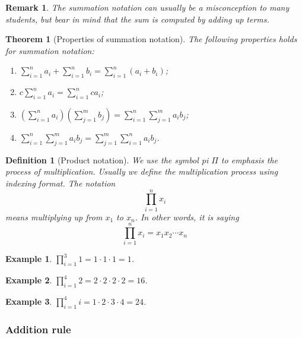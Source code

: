 \documentclass[12pt]{article}
\newtheorem{definition}{Definition}[section]
\newtheorem*{theorem}{Theorem}
\newtheorem*{remark}{Remark}
\newtheorem*{example}{Example}
\begin{document}
    \begin{remark}
        The summation notation can usually be a misconception to many students, but bear in mind that the sum is computed by adding up terms.
    \end{remark}

    \begin{theorem}[Properties of summation notation]
        The following properties holds for summation notation:\begin{enumerate}
            \item $\displaystyle\sum_{i=1}^{n}a_i+\sum_{i=1}^{n}b_i=\sum_{i=1}^{n}(a_i+b_i)$;
            \item $\displaystyle c\sum_{i=1}^{n}a_i=\sum_{i=1}^{n}ca_i$;
            \item $\displaystyle (\sum_{i=1}^{n}a_i)(\sum_{j=1}^{m}b_j)=\sum_{i=1}^{n}\sum_{j=1}^{m}a_ib_j$;
            \item $\displaystyle \sum_{i=1}^{n}\sum_{j=1}^{m}a_ib_j=\sum_{j=1}^{m}\sum_{i=1}^{n}a_ib_j$.
        \end{enumerate}
    \end{theorem}

    \begin{definition}[Product notation]
        We use the symbol pi $\Pi$ to emphasis the process of multiplication. Usually we define the multiplication process using indexing format. The notation $$\prod_{i=1}^{n}x_i$$ means multiplying up from $x_1$ to $x_n$. In other words, it is saying $$\prod_{i=1}^{n}x_i = x_1 x_2 \cdots x_n$$
    \end{definition}

    \begin{example}
        $\displaystyle\prod_{i=1}^{3}1 = 1\cdot 1\cdot 1 = 1$. 
    \end{example}
    
    \begin{example}
        $\displaystyle\prod_{i=1}^{4}2 = 2\cdot 2\cdot 2\cdot 2 = 16$. 
    \end{example}

    \begin{example}
        $\displaystyle\prod_{i=1}^{4}i=1\cdot 2\cdot 3\cdot 4=24$.
    \end{example}

    \subsubsection*{Addition rule}
\end{document}
